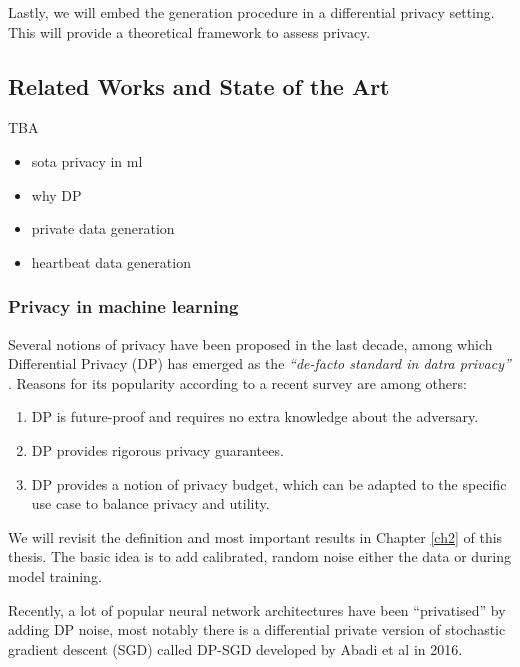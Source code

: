 Lastly, we will embed the generation procedure in a differential privacy setting. This will provide a theoretical framework to assess privacy.

\subsection{Related Works and State of the Art}
TBA
\begin{itemize}
    \item sota privacy in ml 
    \item why DP
    \item private data generation
    \item heartbeat data generation
\end{itemize}
\subsubsection*{Privacy in machine learning}
Several notions of privacy have been proposed in the last decade, among which Differential Privacy (DP) has emerged as the \textit{``de-facto standard in datra privacy''} \parencite{kim2021survey}. Reasons for its popularity according to a recent survey \parencite{surv_dp2021} are among others:

\begin{enumerate}
    \item DP is future-proof and requires no extra knowledge about the adversary.
    \item DP provides rigorous privacy guarantees.
    \item DP provides a notion of privacy budget, which can be adapted to the specific use case to balance privacy and utility.
\end{enumerate}

We will revisit the definition and most important results in Chapter \ref{ch2} of this thesis. The basic idea is to add calibrated, random noise either the data or during model training.

Recently, a lot of popular neural network architectures have been ``privatised'' by adding DP noise, most notably there is a differential private version of stochastic gradient descent (SGD) called DP-SGD developed by Abadi et al \parencite{Abadi_2016} in 2016.

